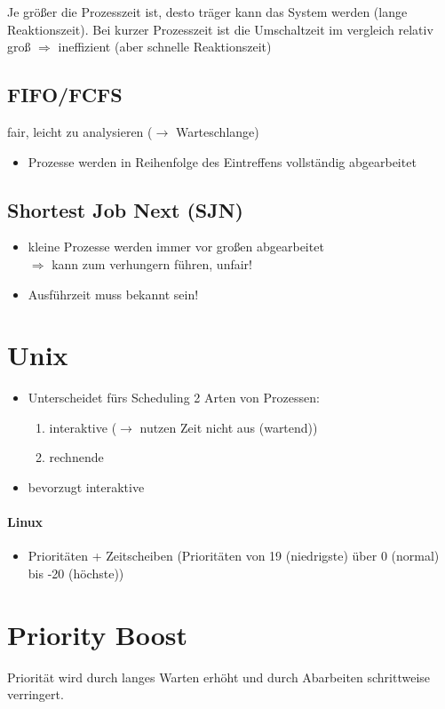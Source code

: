 \documentclass{scrreprt}
\renewcommand{\imptnt}[1]{#1}
\begin{document}
Je größer die Prozesszeit ist, desto träger kann das System werden (lange Reaktionszeit). Bei kurzer Prozesszeit ist die Umschaltzeit im vergleich relativ groß $\Rightarrow$ ineffizient (aber schnelle Reaktionszeit)

\subsection{FIFO/FCFS}
fair, leicht zu analysieren ($\to$ Warteschlange)
\begin{itemize}
\item Prozesse werden in Reihenfolge des Eintreffens vollständig abgearbeitet
\end{itemize}
\subsection{Shortest Job Next (SJN)}
\begin{itemize}
\item kleine Prozesse werden immer vor großen abgearbeitet\\
$\Rightarrow$ kann zum \imptnt{verhungern} führen, unfair!
\item Ausführzeit muss bekannt sein!
\end{itemize}

\section{Unix}
\begin{itemize}
\item Unterscheidet fürs Scheduling \imptnt{2 Arten von Prozessen}:
\begin{enumerate}
\item interaktive ($\to$ nutzen Zeit nicht aus (wartend))
\item rechnende
\end{enumerate}
\item \imptnt{bevorzugt interaktive}
\end{itemize}

\paragraph{Linux}
\begin{itemize}
\item Prioritäten + Zeitscheiben (Prioritäten von 19 (niedrigste) über 0 (normal) bis -20 (höchste))
\end{itemize}

\section{Priority Boost}
Priorität wird durch langes Warten erhöht und durch Abarbeiten schrittweise verringert.
\end{document}
